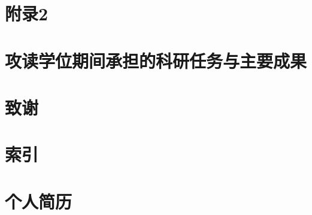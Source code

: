\documentclass[master]{fnuthesis}
\begin{document}
\chapter{附录2}

\printbibliography[heading=bibnumbered]

\chapter{攻读学位期间承担的科研任务与主要成果}

\chapter{致谢}

\chapter{索引}

\chapter{个人简历}
\end{document}
